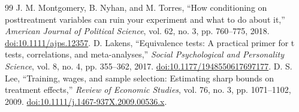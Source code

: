\begin{thebibliography}{99}
 J. M. Montgomery, B. Nyhan, and M. Torres, ``How conditioning on posttreatment variables can ruin your experiment and what to do about it,'' \textit{American Journal of Political Science}, vol. 62, no. 3, pp. 760--775, 2018. \href{https://doi.org/10.1111/ajps.12357}{doi:10.1111/ajps.12357}.
 D. Lakens, ``Equivalence tests: A practical primer for t tests, correlations, and meta-analyses,'' \textit{Social Psychological and Personality Science}, vol. 8, no. 4, pp. 355--362, 2017. \href{https://doi.org/10.1177/1948550617697177}{doi:10.1177/1948550617697177}.
 D. S. Lee, ``Training, wages, and sample selection: Estimating sharp bounds on treatment effects,'' \textit{Review of Economic Studies}, vol. 76, no. 3, pp. 1071--1102, 2009. \href{https://doi.org/10.1111/j.1467-937X.2009.00536.x}{doi:10.1111/j.1467-937X.2009.00536.x}.
\end{thebibliography}
